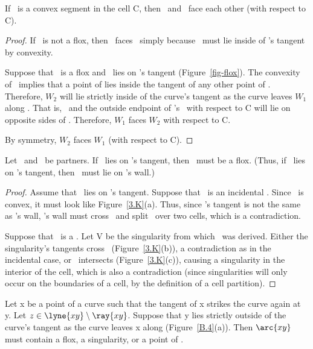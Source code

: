 %
\begin{lemma}
\label{lem-face}
If \arc{\wo\wt}\ is a convex segment in the cell C, 
then \wo\ and \wt\ face each other (with respect to C).
\end{lemma}
%
\begin{proof}
If \wo\ is not a flox, then \wo\ faces \wt\ simply because 
\wt\ must lie inside of \wo's tangent by convexity.

Suppose that \wo\ is a flox and \wt\ lies on \wo's tangent 
(Figure~\ref{fig-flox}).
The convexity of \arc{\wo\wt}\ implies that a point of
\arc{\wo\wt} lies inside the tangent of any other point of \arc{\wo\wt}.
Therefore, $W_{2}$ 
will lie strictly inside of the curve's tangent as the curve
leaves $W_{1}$ along \arc{\wo\wt}.
That is,
\wt\ and the outside endpoint of \wo's \cellsegment\ with respect to C
will lie on opposite sides of \wo.
Therefore, $W_{1}$ faces $W_{2}$ with respect to C.

By symmetry, $W_{2}$ faces $W_{1}$ (with respect to C).
\end{proof}
%
\begin{lemma}
\label{lem-lies.on}
Let \wo\ and \wt\ be partners.
If \wt\ lies on \wo's tangent, then \wo\ must be a flox.
(Thus, if \wt\ lies on \wo's tangent, then \wt\ must lie on \wo's wall.)
\end{lemma}
\begin{proof}
Assume that \wt\ lies on \wo's tangent.
Suppose that \wo\ is an incidental \wallpoint.
Since \wwa\ is convex, it must look like Figure~\ref{3.K}(a).
Thus, since \wo's tangent is not the same as \wo's wall,
\wo's wall must cross \wwa\ and split \wwa\ over two cells,
which is a contradiction.

Suppose that \wo\ is a \pseudo.
Let V be the singularity from which \wo\ was derived.
Either the singularity's tangents cross \wwa\ (Figure~\ref{3.K}(b)),
a contradiction as in the incidental case, 
or \wwa\ intersects  (Figure~\ref{3.K}(c)),
causing a singularity in the
interior of the cell, which is also a contradiction (since singularities
will only occur on the boundaries of a cell, by the definition of a cell
partition).
\end{proof}
%
%
%
\begin{lemma}
\label{lem-forthmsamewalls}
Let x be a point of a curve such that the tangent of x strikes the curve
again at y.
Let $z \in \lyne{xy} \setminus \ray{xy}$.
Suppose that y lies strictly outside of the curve's tangent as the curve
leaves x along  (Figure~\ref{B.4}(a)).
Then $\arc{xy}$ must contain a flox, a singularity, or a point 
of .
\end{lemma}
